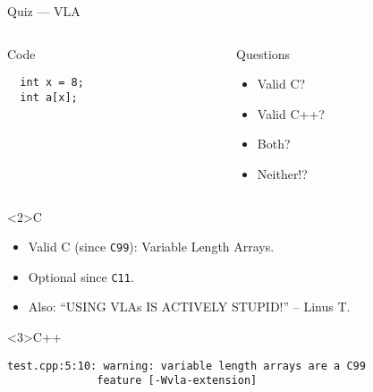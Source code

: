 \documentclass[presentation,aspectratio=169]{beamer}
\begin{document}
\begin{frame}[fragile,label={sec:org23c4234}]{Quiz — VLA}
\begin{columns}
\begin{column}{0.48\columnwidth}
\begin{block}{Code}
\begin{verbatim}
  int x = 8;
  int a[x];
\end{verbatim}
\end{block}
\end{column}

\begin{column}{0.48\columnwidth}
\begin{block}{Questions}
\begin{itemize}
\item Valid C?
\item Valid C++?
\item Both?
\item Neither!?
\end{itemize}
\end{block}
\end{column}
\end{columns}

\begin{block}<2>{C}
\begin{itemize}
\item Valid C (since \texttt{C99}): Variable Length Arrays.
\item Optional since \texttt{C11}.
\item Also: ``USING VLAs IS ACTIVELY STUPID!'' -- Linus T.
\end{itemize}
\end{block}

\vspace{-2cm}
\begin{block}<3>{C++}
\begin{verbatim}
test.cpp:5:10: warning: variable length arrays are a C99
              feature [-Wvla-extension]
\end{verbatim}
\end{block}
\end{frame}

\end{document}
